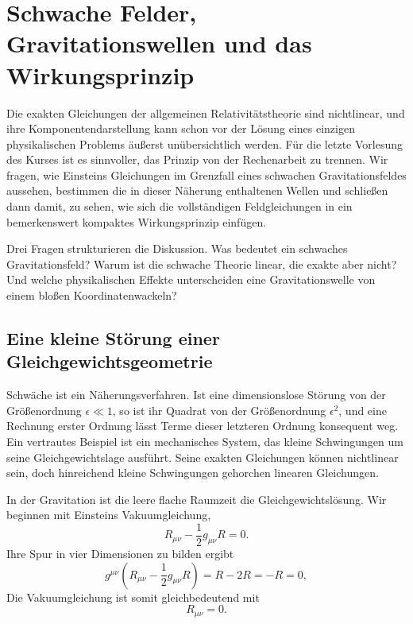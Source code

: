 \chapter{Schwache Felder, Gravitationswellen und das Wirkungsprinzip}

Die exakten Gleichungen der allgemeinen Relativitätstheorie sind nichtlinear, und ihre Komponentendarstellung kann schon vor der Lösung eines einzigen physikalischen Problems äußerst unübersichtlich werden. Für die letzte Vorlesung des Kurses ist es sinnvoller, das Prinzip von der Rechenarbeit zu trennen. Wir fragen, wie Einsteins Gleichungen im Grenzfall eines schwachen Gravitationsfeldes aussehen, bestimmen die in dieser Näherung enthaltenen Wellen und schließen dann damit, zu sehen, wie sich die vollständigen Feldgleichungen in ein bemerkenswert kompaktes Wirkungsprinzip einfügen.

Drei Fragen strukturieren die Diskussion. Was bedeutet ein schwaches Gravitationsfeld? Warum ist die schwache Theorie linear, die exakte aber nicht? Und welche physikalischen Effekte unterscheiden eine Gravitationswelle von einem bloßen Koordinatenwackeln?

\section{Eine kleine Störung einer Gleichgewichtsgeometrie}

Schwäche ist ein Näherungsverfahren. Ist eine dimensionslose Störung von der Größenordnung \(\epsilon\ll1\), so ist ihr Quadrat von der Größenordnung \(\epsilon^2\), und eine Rechnung erster Ordnung lässt Terme dieser letzteren Ordnung konsequent weg. Ein vertrautes Beispiel ist ein mechanisches System, das kleine Schwingungen um seine Gleichgewichtslage ausführt. Seine exakten Gleichungen können nichtlinear sein, doch hinreichend kleine Schwingungen gehorchen linearen Gleichungen.

In der Gravitation ist die leere flache Raumzeit die Gleichgewichtslösung. Wir beginnen mit Einsteins Vakuumgleichung,
\begin{equation}
 R_{\mu\nu}-\frac12 g_{\mu\nu}R=0.
 \label{eq:l10-vacuum-einstein}
\end{equation}
Ihre Spur in vier Dimensionen zu bilden ergibt
\begin{equation}
 g^{\mu\nu}
 \left(R_{\mu\nu}-\frac12 g_{\mu\nu}R\right)
 =R-2R=-R=0,
\end{equation}
Die Vakuumgleichung ist somit gleichbedeutend mit
\begin{equation}
 R_{\mu\nu}=0.
 \label{eq:l10-ricci-flat}
\end{equation}

